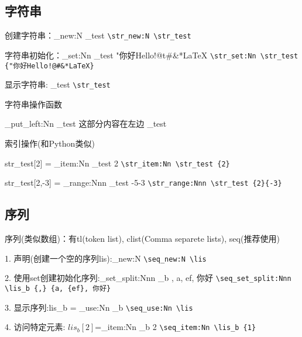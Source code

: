 \documentclass[fontset=windows]{article}
\begin{document}
\vspace*{2em}
\subsection{字符串}
创建字符串：\str_new:N \str_test \hspace*{2em} \verb!\str_new:N \str_test!\par 
字符串初始化：\str_set:Nn \str_test {"你好Hello!@t#&*LaTeX} \hspace*{1em} \verb .\str_set:Nn \str_test {"你好Hello!@#&*LaTeX} .\par 
显示字符串: \hspace*{2.5em} \str_test  \hspace*{2em} \verb!\str_test!\par 

\vspace*{1em}
字符串操作函数\par 
\str_put_left:Nn \str_test {这部分内容在左边}
\str_test \par 

索引操作(和Python类似)\par 
str_test[2] = \str_item:Nn \str_test {2} \hspace*{2.5em} \verb!\str_item:Nn \str_test {2}!\par
str_test[2,-3] = \str_range:Nnn \str_test {-5}{-3} \hspace*{1em} \verb!\str_range:Nnn \str_test {2}{-3}!\par 

\subsection{序列}
序列(类似数组)：有tl(token list), clist(Comma separete lists), seq(推荐使用)\par 
1. 声明(创建一个空的序列lis):\seq_new:N \lis \hspace*{2em} \verb!\seq_new:N \lis!\par 
2. 使用set创建初始化序列:\seq_set_split:Nnn \lis_b {,} {a, {ef}, 你好} \hspace*{2em} \verb!\seq_set_split:Nnn \lis_b {,} {a, {ef}, 你好}!\par 
3. 显示序列:lis_b = \seq_use:Nn \lis_b {} \hspace*{2em} \verb!\seq_use:Nn \lis!\par 
4. 访问特定元素: $lis_b[2]$=\seq_item:Nn \lis_b {2} \hspace*{2em} \verb!\seq_item:Nn \lis_b {1}!\par 
\end{document}
